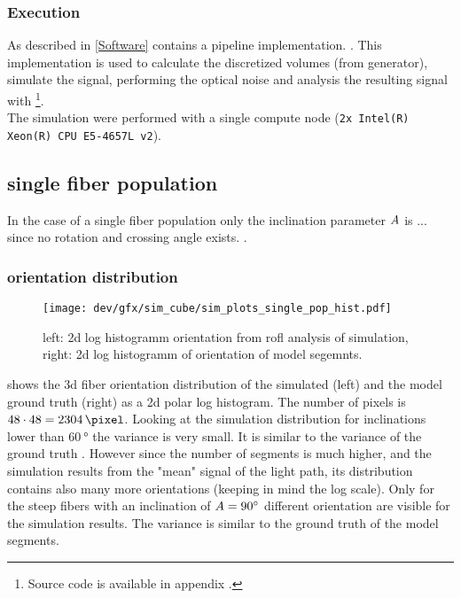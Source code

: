 \subsubsection{Execution}
% 
As described in \cref{Software} \fastpli{} contains a pipeline implementation. \dummy{}.
This implementation is used to calculate the discretized volumes (from generator), simulate the signal, performing the optical noise and analysis the resulting signal with \rofl{}\footnote{Source code is available in appendix \dummy{}.}.
\\
% 
The simulation were performed with a single compute node (\texttt{2x Intel(R) Xeon(R) CPU E5-4657L v2}).

% 
\subsection{single fiber population}
% 
In the case of a single fiber population only the inclination parameter $\textnormal{$A$}{}$ is ... since no rotation and crossing angle exists.
.
% 
\subsubsection{orientation distribution}
% 
\begin{figure}[!tp]
\centering
\texttt{[image: dev/gfx/sim\_cube/sim\_plots\_single\_pop\_hist.pdf]} 
\caption[sim]{left: 2d log histogramm orientation from rofl analysis of simulation, right: 2d log histogramm of orientation of model segemnts. }
\label{fig:single_fiber_pop_hist}
\end{figure}
% 
 shows the 3d fiber orientation distribution of the simulated (left) and the model ground truth (right) as a 2d polar log histogram.
The number of pixels is $48\cdot48=\SI{2304}{\pixel}$.
Looking at the simulation distribution for inclinations lower than $\SI{60}{\degree}$ the variance is very small.
It is similar to the variance of the ground truth .
However since the number of segments is much higher, and the simulation results from the "mean" signal of the light path, its distribution contains also many more orientations (keeping in mind the log scale).
Only for the steep fibers with an inclination of $\textnormal{$A$}{}=\SI{90}{\degree}$ different orientation are visible for the simulation results.
The variance is similar to the ground truth of the model segments.
% 
% 
